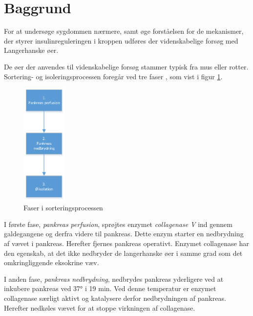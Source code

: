 \section{Baggrund}
For at undersøge sygdommen nærmere, samt øge forståelsen for de mekanismer, der styrer insulinreguleringen i kroppen udføres der videnskabelige forsøg med Langerhanske øer.

De øer der anvendes til videnskabelige forsøg stammer typisk fra mus eller rotter. Sortering- og isoleringsprocessen foregår ved tre faser \citep{per}, som vist i figur \ref{fig:sortproces}. 

\begin{figure}[H]
	\centering
	\includegraphics[width=0.2\textwidth]{billeder/sortering-crop.pdf}
	\caption{Faser i sorteringsprocessen}
	\label{fig:sortproces}
\end{figure}

I første fase, \textit{pankreas perfusion}, sprøjtes enzymet \textit{collagenase V} ind gennem galdegangene og derfra videre til  pankreas. Dette enzym starter en nedbrydning af vævet i pankreas. Herefter fjernes pankreas operativt. Enzymet collagenase har den egenskab, at det ikke nedbryder de langerhanske øer i samme grad som det omkringliggende eksokrine væv.

I anden fase, \textit{pankreas nedbrydning}, nedbrydes pankreas yderligere ved at inkubere pankreas ved 37° i 19 min. Ved denne temperatur er enzymet collagenase særligt aktivt og katalysere derfor nedbrydningen af pankreas. Herefter nedkøles vævet for at stoppe virkningen af collagenase.


